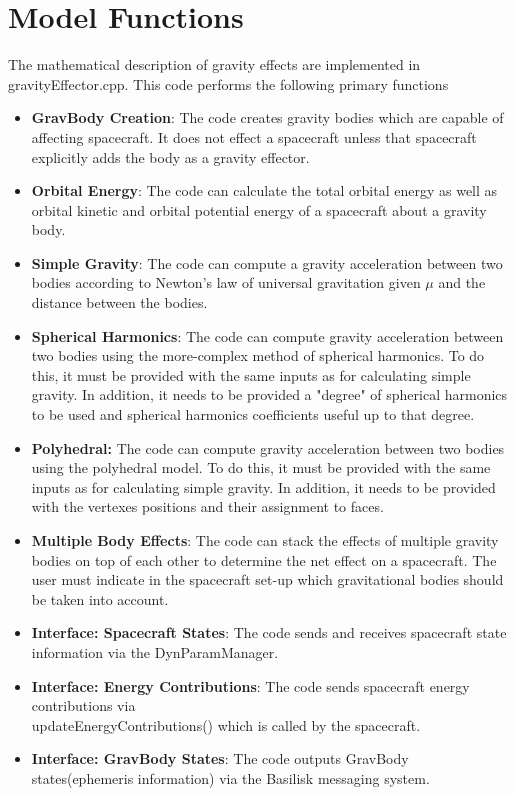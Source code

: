 \section{Model Functions}
The mathematical description of gravity effects are implemented in gravityEffector.cpp. This code performs the following primary functions
\begin{itemize}
	\item \textbf{GravBody Creation}: The code creates gravity bodies which are capable of affecting spacecraft. It does not effect a spacecraft unless that spacecraft explicitly adds the body as a gravity effector.
	\item \textbf{Orbital Energy}: The code can calculate the total orbital energy as well as orbital kinetic and orbital potential energy of a spacecraft about a gravity body.
	\item \textbf{Simple Gravity}: The code can compute a gravity acceleration between two bodies according to Newton's law of universal gravitation given $\mu$ and the distance between the bodies.
	\item \textbf{Spherical Harmonics}: The code can compute gravity acceleration between two bodies using the more-complex method of spherical harmonics. To do this, it must be provided with the same inputs as for calculating simple gravity. In addition, it needs to be provided a "degree" of spherical harmonics to be used and spherical harmonics coefficients useful up to that degree.
	\item \textbf{Polyhedral:} The code can compute gravity acceleration between two bodies using the polyhedral model. To do this, it must be provided with the same inputs as for calculating simple gravity. In addition, it needs to be provided with the vertexes positions and their assignment to faces. 
	\item \textbf{Multiple Body Effects}: The code can stack the effects of multiple gravity bodies on top of each other to determine the net effect on a spacecraft. The user must indicate in the spacecraft set-up which gravitational bodies should be taken into account.
	\item \textbf{Interface: Spacecraft States}: The code sends and receives spacecraft state information via the DynParamManager.
	\item \textbf{Interface: Energy Contributions}: The code sends spacecraft energy contributions via \\updateEnergyContributions() which is called by the spacecraft.
	\item \textbf{Interface: GravBody States}: The code outputs GravBody states(ephemeris information) via the Basilisk messaging system.
	
\end{itemize}

